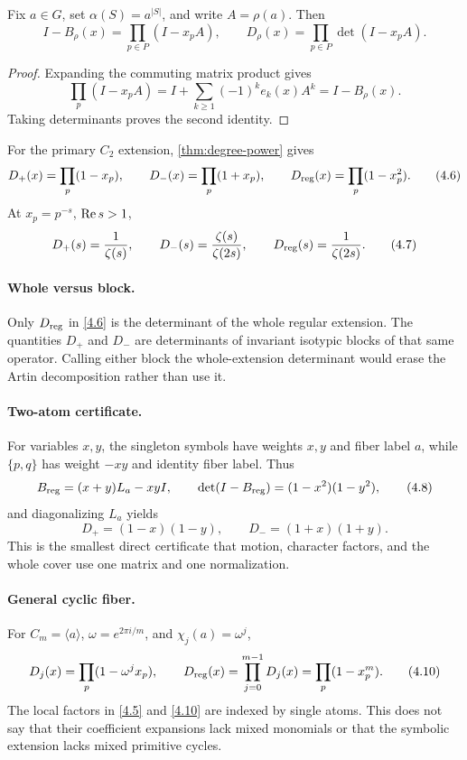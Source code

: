 \begin{theorem}
\label{thm:degree-power}
Fix \(a\in G\), set \(\alpha(S)=a^{|S|}\), and write \(A=\rho(a)\).  Then
\[
I-B_\rho(x)=\prod_{p\in P}(I-x_pA),
\qquad
D_\rho(x)=\prod_{p\in P}\det(I-x_pA).
\tag{4.5}\label{4.5}
\]
\end{theorem}

\begin{proof}
Expanding the commuting matrix product gives
\[
\prod_p(I-x_pA)=
I+\sum_{k\ge1}(-1)^ke_k(x)A^k
=I-B_\rho(x).
\]
Taking determinants proves the second identity.
\end{proof}

For the primary \(C_2\) extension, \cref{thm:degree-power} gives
\[
D_+(x)=\prod_p(1-x_p),\qquad
D_-(x)=\prod_p(1+x_p),\qquad
D_{\mathrm{reg}}(x)=\prod_p(1-x_p^2).
\tag{4.6}\label{4.6}
\]
At \(x_p=p^{-s}\), \(\operatorname{Re} s>1\),
\[
D_+(s)=\frac1{\zeta(s)},\qquad
D_-(s)=\frac{\zeta(s)}{\zeta(2s)},\qquad
D_{\mathrm{reg}}(s)=\frac1{\zeta(2s)}.
\tag{4.7}\label{4.7}
\]



\paragraph{Whole versus block.}
Only \(D_{\mathrm{reg}}\) in \eqref{4.6} is the determinant of the whole regular
extension.  The quantities \(D_+\) and \(D_-\) are determinants of invariant
isotypic blocks of that same operator.  Calling either block the
whole-extension determinant would erase the Artin decomposition rather than
use it.

\paragraph{Two-atom certificate.}
For variables \(x,y\), the singleton symbols have weights \(x,y\) and fiber
label \(a\), while \(\{p,q\}\) has weight \(-xy\) and identity fiber label.
Thus
\[
B_{\mathrm{reg}}=(x+y)L_a-xyI,\qquad
\det(I-B_{\mathrm{reg}})=(1-x^2)(1-y^2),
\tag{4.8}\label{4.8}
\]
and diagonalizing \(L_a\) yields
\[
D_+=(1-x)(1-y),\qquad D_-=(1+x)(1+y).
\tag{4.9}\label{4.9}
\]
This is the smallest direct certificate that motion, character factors, and
the whole cover use one matrix and one normalization.

\paragraph{General cyclic fiber.}
For \(C_m=\langle a\rangle\), \(\omega=e^{2\pi i/m}\), and
\(\chi_j(a)=\omega^j\),
\[
D_j(x)=\prod_p(1-\omega^jx_p),\qquad
D_{\mathrm{reg}}(x)=\prod_{j=0}^{m-1}D_j(x)=\prod_p(1-x_p^m).
\tag{4.10}\label{4.10}
\]
The local factors in \eqref{4.5} and \eqref{4.10} are indexed by single
atoms.  This does not say that their coefficient expansions lack mixed
monomials or that the symbolic extension lacks mixed primitive cycles.
